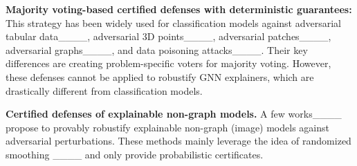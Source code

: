 {\bf Majority voting-based certified defenses with deterministic guarantees:} 
This strategy has been widely used for classification models against adversarial tabular data____,
adversarial 3D points____, adversarial patches____, adversarial graphs____, and {data poisoning attacks____}. 
Their key differences are creating problem-specific voters for majority voting. 
 {However, these defenses  cannot be applied to 
robustify GNN explainers, which are drastically different from classification models.} 

{\bf Certified defenses of explainable non-graph models.} A few works____ propose to provably robustify explainable non-graph (image) models against adversarial perturbations. These methods mainly leverage the idea of randomized smoothing ____ and only provide probabilistic certificates.
